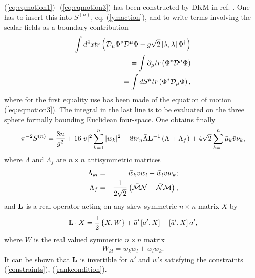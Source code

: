 \documentclass[a4paper,12pt]{article}
\begin{document}
(\ref{eq:eqmotion1}) -(\ref{eq:eqmotion3})
has been constructed by DKM in ref. \cite{dorey1}.  One has to 
insert this into $S^{(n)}$, eq. (\ref{ymaction}), and to write 
terms involving the scalar fields as a boundary contribution 
\begin{eqnarray}
\int d^4 x tr \left( {\cal D}_{\mu} \Phi^* 
{\cal D}^{\mu} \Phi -g \sqrt{2} \left[
\lambda , \lambda
\right] \Phi^{\dagger}
\right) \nonumber \\
=\int \partial_{\mu} tr \left(\Phi^* {\cal D}^{\mu} \Phi
\right) \nonumber \\ 
= \int dS^{\mu} tr \left(\Phi^* {\cal D}_{\mu} \Phi \right), 
\nonumber 
\end{eqnarray}
where for the first equality use has been made of the equation  of 
motion (\ref{eq:eqmotion3}). The integral in the last line is to be 
evaluated on the three sphere formally bounding Euclidean four-space. 
One obtains finally 
\begin{eqnarray}
\label{action}
\pi^{-2}S^{(n)}=\frac{8n}{g^2}+16|v|^2\sum_{k=1}^n |w_k|^2 
-8 tr_n \bar{\Lambda}{\bf L}^{-1}\left(\Lambda + \Lambda_{f} \right)  
+ 4\sqrt{2} \sum_{k=1}^n \bar{\mu}_k \bar{v} \nu_k ,
\end{eqnarray}
where $\Lambda$ and $\Lambda_f$ are $n\times n$ antisymmetric 
matrices 
\begin{eqnarray}  
\Lambda_{kl}&=&\bar{w}_k v w_l - \bar{w}_l v w_k ;\\
\Lambda_f&=&\frac{1}{2\sqrt{2}}\left(\bar{{\cal M}}{\cal N}- 
\bar{{\cal N}}{\cal M}\right),
\end{eqnarray} 
and ${\bf L}$ is a real operator acting on any skew symmetric 
$n\times n$ matrix $X$ by 
\begin{eqnarray} 
{\bf L}\cdot X = \frac{1}{2}\left\{X,W\right\} + 
\bar{a}'\left[a',X\right]- \left[\bar{a}',X\right]a', 
\label{loperator}
\end{eqnarray} 
where $W$ is the real valued symmetric $n\times n$ matrix
\begin{eqnarray}
W_{kl}=\bar{w}_k w_l +\bar{w}_l w_k.
\end{eqnarray} 
It can be shown that ${\bf L}$ is invertible for $a'$ and 
$w$'s satisfying the constraints (\ref{constraints}), 
(\ref{rankcondition}). 
\end{document}
